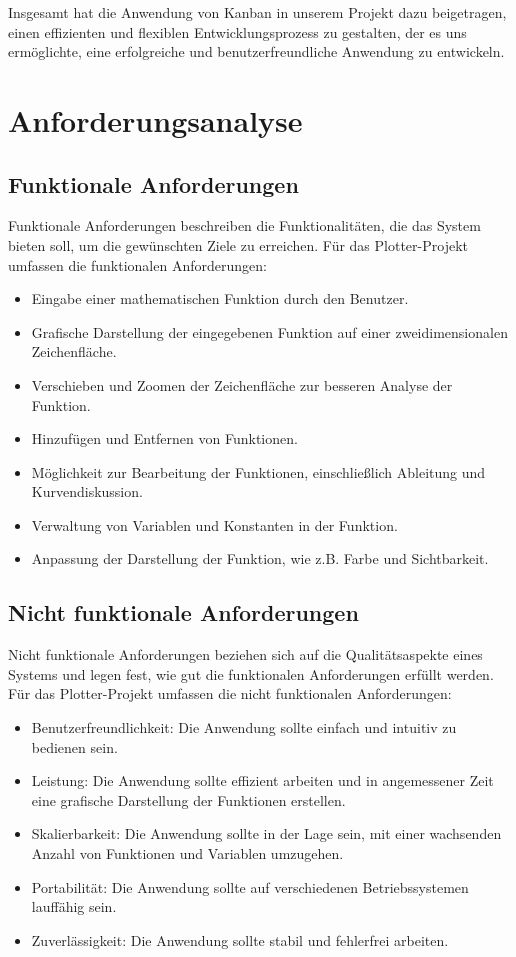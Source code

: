 \documentclass[a4paper]{article}
\begin{document}
\newpage

Insgesamt hat die Anwendung von Kanban in unserem Projekt dazu beigetragen, einen effizienten und flexiblen Entwicklungsprozess zu gestalten, der es uns ermöglichte, eine erfolgreiche und benutzerfreundliche Anwendung zu entwickeln.

\section{Anforderungsanalyse}
\subsection{Funktionale Anforderungen}
Funktionale Anforderungen beschreiben die Funktionalitäten, die das System bieten soll, um die gewünschten Ziele zu erreichen. Für das Plotter-Projekt umfassen die funktionalen Anforderungen:

\begin{itemize}
	\item Eingabe einer mathematischen Funktion durch den Benutzer.
	\item Grafische Darstellung der eingegebenen Funktion auf einer zweidimensionalen Zeichenfläche.
	\item Verschieben und Zoomen der Zeichenfläche zur besseren Analyse der Funktion.
	\item Hinzufügen und Entfernen von Funktionen.
	\item Möglichkeit zur Bearbeitung der Funktionen, einschließlich Ableitung und Kurvendiskussion.
	\item Verwaltung von Variablen und Konstanten in der Funktion.
	\item Anpassung der Darstellung der Funktion, wie z.B. Farbe und Sichtbarkeit.
\end{itemize}

\subsection{Nicht funktionale Anforderungen}
Nicht funktionale Anforderungen beziehen sich auf die Qualitätsaspekte eines Systems und legen fest, wie gut die funktionalen Anforderungen erfüllt werden. Für das Plotter-Projekt umfassen die nicht funktionalen Anforderungen:

\begin{itemize}
	\item Benutzerfreundlichkeit: Die Anwendung sollte einfach und intuitiv zu bedienen sein.
	\item Leistung: Die Anwendung sollte effizient arbeiten und in angemessener Zeit eine grafische Darstellung der Funktionen erstellen.
	\item Skalierbarkeit: Die Anwendung sollte in der Lage sein, mit einer wachsenden Anzahl von Funktionen und Variablen umzugehen.
	\item Portabilität: Die Anwendung sollte auf verschiedenen Betriebssystemen lauffähig sein.
	\item Zuverlässigkeit: Die Anwendung sollte stabil und fehlerfrei arbeiten.
\end{itemize}
\end{document}
